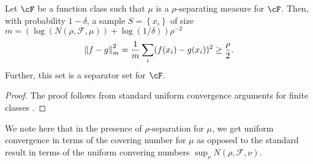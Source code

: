         

\begin{lemma}
    \label{lem:separator_set_2}
    Let $\cF$ be a function class such that $\mu$ is a $\rho$-separating measure for $\cF$.
    Then, with probability $1 - \delta$, a sample $S = \left\{ x_i \right\}$  of size $m = ( \log ( N( \rho , \mathcal{F} , \mu )  ) + \log(1/ \delta)) \rho^{-2}$ 
    \begin{align}
        \left\|f - g\right\|_m^2 = \frac{1}{m} \sum_i (f(x_i) - g(x_i))^2  \geq \frac{\rho}{2}. 
    \end{align} 
    Further, this set is a separator set for $\cF$.
    \end{lemma}
    \begin{proof}
        The proof follows from standard uniform convergence arguments for finite classes \citep{shai}.
    \end{proof}
    
    We note here that in the presence of $\rho$-separation for $\mu$, we get uniform convergence in terms of the covering number for $\mu$ as opposed to the standard result in terms of the uniform convering numbers $ \sup_{\nu} N( \rho , \mathcal{F} , \nu )  $.   
    



  






    
    
    
    
    
    


    
    
   

   
